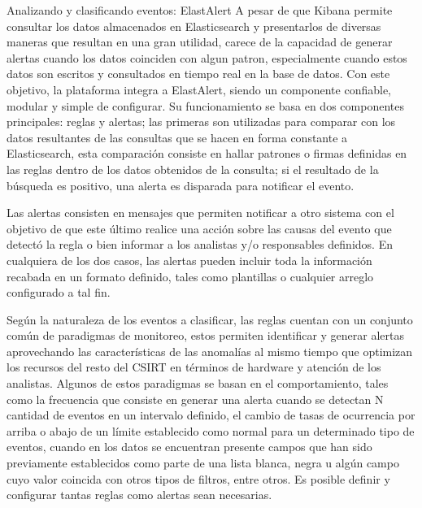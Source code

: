    \begin{subsection}{Analizando y clasificando eventos: ElastAlert}
     A pesar de que Kibana permite consultar los datos almacenados en Elasticsearch y presentarlos de diversas maneras que resultan en una gran utilidad, carece de la capacidad de generar alertas cuando los datos coinciden con algun patron, especialmente cuando estos datos son escritos y consultados en tiempo real en la base de datos. Con este objetivo, la plataforma integra a ElastAlert, siendo un componente confiable, modular y simple de configurar. Su funcionamiento se basa en dos componentes principales: reglas y alertas; las primeras son utilizadas para comparar con los datos resultantes de las consultas que se hacen en forma constante a Elasticsearch, esta comparación consiste en hallar patrones o firmas definidas en las reglas dentro de los datos obtenidos de la consulta; si el resultado de la búsqueda es positivo, una alerta es disparada para notificar el evento. \par
     Las alertas consisten en mensajes que permiten notificar a otro sistema con el objetivo de que este último realice una acción sobre las causas del evento que detectó la regla o bien informar a los analistas y/o responsables definidos. En cualquiera de los dos casos, las alertas pueden incluir toda la información recabada en un formato definido, tales como plantillas o cualquier arreglo configurado a tal fin. \par
     Según la naturaleza de los eventos a clasificar, las reglas cuentan con un conjunto común de paradigmas de monitoreo, estos permiten identificar y generar alertas aprovechando las características de las anomalías al mismo tiempo que optimizan los recursos del resto del CSIRT en términos de hardware y atención de los analistas. Algunos de estos paradigmas se basan en el comportamiento, tales como la frecuencia que consiste en generar una alerta cuando se detectan N cantidad de eventos en un intervalo definido, el cambio de tasas de ocurrencia por arriba o abajo de un límite establecido como normal para un determinado tipo de eventos, cuando en los datos se encuentran presente campos que han sido previamente establecidos como parte de una lista blanca, negra u algún campo cuyo valor coincida con otros tipos de filtros, entre otros. Es posible definir y configurar tantas reglas como alertas sean necesarias. \par

   \end{subsection}
